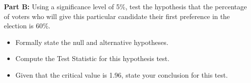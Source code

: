 \noindent \textbf{Part B:} Using a significance level of 5\%, test the hypothesis that the percentage of voters who will give this 
particular candidate their first preference in the election is 60\%.{\tiny } 

\begin{itemize}

\item  Formally state the null and alternative hypotheses.

\item  Compute the Test Statistic for this hypothesis test.

\item  Given that the critical value is 1.96, state your conclusion for this test.
\end{itemize}

